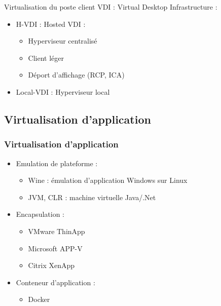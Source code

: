 \begin{frame}{Virtualisation du poste client}
VDI : Virtual Desktop Infrastructure :
\begin{itemize}
\item H-VDI : Hosted VDI :
\begin{itemize}
\item Hyperviseur centralisé
\item Client léger
\item Déport d'affichage (RCP, ICA)
\end{itemize}

\item Local-VDI : Hyperviseur local
\end{itemize}
\end{frame}

\subsection{Virtualisation d'application}

\begin{frame}
\frametitle{Virtualisation d'application}
\begin{itemize}
\item Emulation de plateforme : 
\begin{itemize}
\item Wine : émulation d'application Windows sur Linux
\item JVM, CLR : machine virtuelle Java/.Net
\end{itemize}
\item Encapsulation :
\begin{itemize}
\item  VMware ThinApp
\item Microsoft APP-V
\item Citrix XenApp
\end{itemize}
\item Conteneur d'application :
\begin{itemize}
\item Docker
\end{itemize}

\end{itemize}
\end{frame}

